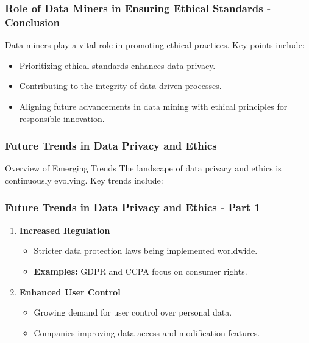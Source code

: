 \documentclass[aspectratio=169]{beamer}
\begin{document}
\begin{frame}[fragile]
    \frametitle{Role of Data Miners in Ensuring Ethical Standards - Conclusion}
    Data miners play a vital role in promoting ethical practices. Key points include:
    \begin{itemize}
        \item Prioritizing ethical standards enhances data privacy.
        \item Contributing to the integrity of data-driven processes.
        \item Aligning future advancements in data mining with ethical principles for responsible innovation.
    \end{itemize}
\end{frame}

\begin{frame}[fragile]
    \frametitle{Future Trends in Data Privacy and Ethics}
    \begin{block}{Overview of Emerging Trends}
        The landscape of data privacy and ethics is continuously evolving. Key trends include:
    \end{block}
\end{frame}

\begin{frame}[fragile]
    \frametitle{Future Trends in Data Privacy and Ethics - Part 1}
    \begin{enumerate}
        \item \textbf{Increased Regulation}  
            \begin{itemize}
                \item Stricter data protection laws being implemented worldwide.
                \item \textbf{Examples:} GDPR and CCPA focus on consumer rights.
            \end{itemize}
        \item \textbf{Enhanced User Control}  
            \begin{itemize}
                \item Growing demand for user control over personal data.
                \item Companies improving data access and modification features.
            \end{itemize}
    \end{enumerate}
\end{frame}
\end{document}
